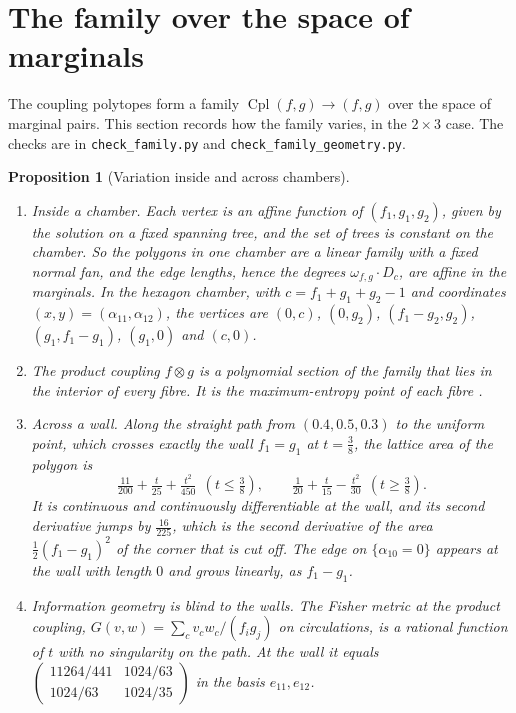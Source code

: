 \documentclass[11pt]{article}
\newtheorem{proposition}[theorem]{Proposition}
\theoremstyle{definition}
\theoremstyle{remark}
\newcommand{\Cpl}{\operatorname{Cpl}}
\begin{document}
\section{The family over the space of marginals}\label{sec:family}

The coupling polytopes form a family $\Cpl(f,g)\to(f,g)$ over the space of marginal pairs. This section records
how the family varies, in the $2\times3$ case. The checks are in \texttt{check\_family.py} and
\texttt{check\_family\_geometry.py}.

\begin{proposition}[Variation inside and across chambers]\label{prop:family}
\leavevmode
\begin{enumerate}[label=(\roman*),leftmargin=*]
\item \emph{Inside a chamber.} Each vertex is an affine function of $(f_1,g_1,g_2)$, given by the solution on a fixed
  spanning tree, and the set of trees is constant on the chamber. So the polygons in one chamber are a linear family
  with a fixed normal fan, and the edge lengths, hence the degrees $\omega_{f,g}\cdot D_c$, are affine in the marginals.
  In the hexagon chamber, with $c=f_1+g_1+g_2-1$ and coordinates $(x,y)=(\alpha_{11},\alpha_{12})$, the vertices are
  $(0,c)$, $(0,g_2)$, $(f_1-g_2,g_2)$, $(g_1,f_1-g_1)$, $(g_1,0)$ and $(c,0)$.
\item \emph{The product coupling} $f\otimes g$ is a polynomial section of the family that lies in the interior of every
  fibre. It is the maximum-entropy point of each fibre \cite[Prop.~6.5]{Conditionals}.
\item \emph{Across a wall.} Along the straight path from $(0.4,0.5,0.3)$ to the uniform point, which crosses exactly the
  wall $f_1=g_1$ at $t=\tfrac38$, the lattice area of the polygon is
  \[
  \tfrac{11}{200}+\tfrac t{25}+\tfrac{t^2}{450}\ \ (t\le\tfrac38),\qquad \tfrac1{20}+\tfrac t{15}-\tfrac{t^2}{30}\ \ (t\ge\tfrac38).
  \]
  It is continuous and continuously differentiable at the wall, and its second derivative jumps by $\tfrac{16}{225}$, which
  is the second derivative of the area $\tfrac12(f_1-g_1)^2$ of the corner that is cut off. The edge on
  $\{\alpha_{10}=0\}$ appears at the wall with length $0$ and grows linearly, as $f_1-g_1$.
\item \emph{Information geometry is blind to the walls.} The Fisher metric at the product coupling,
  $G(v,w)=\sum_cv_cw_c/(f_ig_j)$ on circulations, is a rational function of $t$ with no singularity on the path. At the wall
  it equals $\left(\begin{smallmatrix}11264/441&1024/63\\1024/63&1024/35\end{smallmatrix}\right)$ in the basis
  $e_{11},e_{12}$.
\end{enumerate}
\end{proposition}
\end{document}
